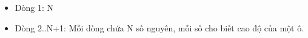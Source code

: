 \begin{itemize}
	\item     Dòng 1: N   
	\item     Dòng 2..N+1: Mỗi dòng chứa N số nguyên, mỗi số cho biết cao độ của một ô.   
\end{itemize}